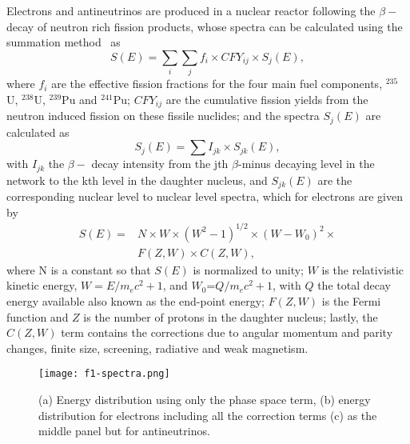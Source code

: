 \documentclass[twocolumn,amsmath,amssymb,10pt,superscriptaddress,a4paper,letterpaper,fleqn]{revtex4-1}
\begin{document}
Electrons and antineutrinos are produced in a nuclear reactor following 
the  $\beta-$ decay of neutron rich fission products, whose spectra can be calculated using the summation method~\cite{vogel81} as
\begin{equation}
  S(E) =  \sum_i \sum_j f_i \times CFY_{ij} \times S_j(E),
  \label{summ}
\end{equation}                   
\noindent where $f_i$ are the effective fission fractions for the four main fuel components,  $^{235}$U,  $^{238}$U,  $^{239}$Pu and  $^{241}$Pu; 
$CFY_{ij}$ are the cumulative fission yields from the neutron induced fission on these fissile nuclides; 
and  the spectra $S_j(E)$ are calculated as
\begin{equation}
  S_j(E) = \sum I_{jk} \times S_{jk}(E),
\end{equation}                   
\noindent with $I_{jk}$ the $\beta-$ decay intensity from the jth $\beta$-minus decaying level in the network to the kth level in the daughter nucleus, 
and $S_{jk}(E)$ are the corresponding nuclear level to nuclear level spectra, 
which for electrons are given by
\begin{equation}
\begin{split}
  S(E)=& N \times W \times (W^2-1)^{1/2} \times (W-W_0)^2  \times \\& F(Z,W) \times C(Z,W),
\end{split}
\label{l2lespec}
\end{equation}                     
\noindent where N is a constant so that $S(E)$ is normalized to unity;
$W$ is the relativistic kinetic energy, 
$W=E/m_ec^2 +1$, and $W_0$=$Q/m_ec^2 +1$, with $Q$ the total decay energy available also known as
the end-point energy; 
$F(Z,W)$ is the Fermi function and $Z$ is the number of protons in the daughter nucleus; lastly,  the $C(Z,W)$ term 
contains the corrections due to angular momentum and parity changes,  finite size, screening, radiative and weak magnetism.

\begin{figure}[t] 
\texttt{[image: f1-spectra.png]}
\caption{
(a) Energy distribution using only the phase space term, 
(b) energy distribution for electrons including all the correction terms  (c) as the middle panel but for antineutrinos.
}
\label{f.spectra}
\end{figure}   
\end{document}
